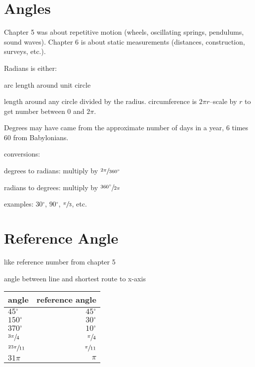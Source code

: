 \documentclass{exam}
\newcommand{\dg}{\ensuremath{^\circ}}
\begin{document}
  \section{Angles}

  Chapter 5 was about repetitive motion (wheels, oscillating springs, pendulums, sound waves).  Chapter 6 is about
  static measurements (distances, construction, surveys, etc.).

  Radians is either:
  \begin{itemize*}
    \item arc length around unit circle
    \item length around any circle divided by the radius.  circumference is $2 \pi r$--scale by $r$ to get number
      between $0$ and $2 \pi$.
  \end{itemize*}

  Degrees may have came from the approximate number of days in a year, 6 times 60 from Babylonians.

  conversions:
  \begin{itemize*}
    \item degrees to radians: multiply by $\sfrac{2 \pi}{360 \dg}$
    \item radians to degrees: multiply by $\sfrac{360 \dg}{2 \pi}$
  \end{itemize*}

  examples: $30\dg$, $90\dg$, $\sfrac{\pi}{3}$, etc.

  \section{Reference Angle}
  \begin{itemize*}
    \item like reference number from chapter 5
    \item angle between line and shortest route to x-axis
  \end{itemize*}

  \begin{tabular}[H]{lr}
    \toprule
    angle                & reference angle \\
    \midrule
    $45 \dg$             & $45 \dg$ \\
    $150 \dg$            & $30 \dg$ \\
    $370 \dg$            & $10 \dg$ \\
    $\sfrac{3 \pi}{4}$   & $\sfrac{\pi}{4}$ \\
    $\sfrac{23 \pi}{11}$ & $\sfrac{\pi}{11}$ \\
    $31 \pi$             & $\pi$ \\
    \bottomrule
  \end{tabular}
\end{document}
